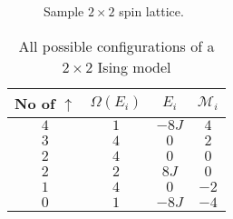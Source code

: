 \documentclass[10pt,a4paper]{amsart}
\begin{document}
\begin{figure}[h]
	\centering
	\caption{Sample $2\times2$ spin lattice.}
	\label{fig:2by2lattice}
\end{figure}

\begin{table}
	\centering
	\caption{All possible configurations of a $2\times2$ Ising model}
	\begin{tabular}{cccc} \hline
	No of $\uparrow$ & $\Omega(E_i)$ & $E_i$ & $\mathcal{M}_i$ \\ \hline
	$4$ & $1$ & $-8J$ & $4$  \\
	$3$ & $4$ & $0$   & $2$ \\
	$2$ & $4$ & $0$   & $0$  \\
	$2$ & $2$ & $8J$  & $0$  \\
	$1$ & $4$ & $0$   & $-2$ \\
	$0$ & $1$ & $-8J$ & $-4$ \\ \hline
	\end{tabular}
	\label{tab:2by2lattice}
\end{table}
\end{document}
